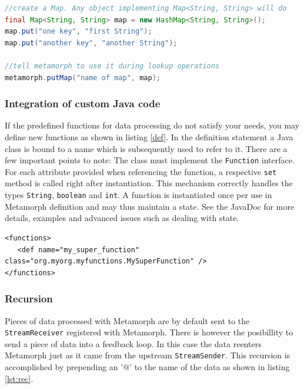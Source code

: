 \documentclass[12pt,a4paper]{article}
\begin{document}
\begin{lstlisting}[float=htb, label=regdata,caption= Registering a map with the metamorph object., language=Java]
//create a Map. Any object implementing Map<String, String> will do
final Map<String, String> map = new HashMap<String, String>();
map.put("one key", "first String");
map.put("another key", "another String");

//tell metamorph to use it during lookup operations
metamorph.putMap("name of map", map);
\end{lstlisting}



\subsubsection{Integration of custom Java code}\label{customfunc}

If the predefined functions for data processing do not satisfy your needs, you may define new functions as shown in listing \ref{def}.
In the definition statement a Java class is bound to a name which is subsequently used to refer to it. There are a few important points to note:
The class must implement the {\tt Function} interface. For each attribute provided when referencing the function, a respective {\tt set} method is called right after instantiation. This mechanism correctly handles the types {\tt String}, {\tt boolean} and {\tt int}. A function is instantiated once per use in Metamorph definition and may thus maintain a state. See the JavaDoc for more details, examples and advanced issues such as dealing with state.

\begin{lstlisting}[float=htb, label=def,caption=User defined functions.]
<functions>
   <def name="my_super_function" class="org.myorg.myfunctions.MySuperFunction" />
</functions> 
\end{lstlisting}


\subsubsection{Recursion}\label{recursion}

Pieces of data processed with Metamorph are by default sent to the {\tt StreamReceiver} registered with Metamorph. There is however the posibillity to send a piece of data into a feedback loop. In this case the data reenters Metamorph just as it came from the upstream {\tt StreamSender}. This recursion is accomplished by prepending an '@' to the name of the data as shown in listing \ref{lst:rec}. 
\end{document}
